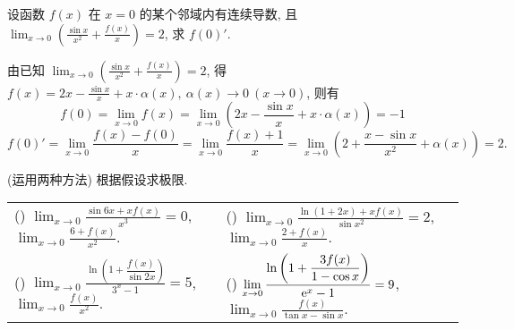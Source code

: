 \begin{example}
    设函数 $f(x)$ 在 $x=0$ 的某个邻域内有连续导数, 且 $\displaystyle\lim_{x\to0}\left(\frac{\sin x}{x^2}+\frac{f(x)}{x}\right)=2$, 求 $f(0)'.$
\end{example}
\begin{solution}
    由已知 $\displaystyle\lim_{x\to0}\left(\frac{\sin x}{x^2}+\frac{f(x)}{x}\right)=2$, 得
    $\displaystyle f(x)=2x-\frac{\sin x}{x}+x\cdot\alpha(x),~\alpha(x)\to0~ (x\to0)$,
    则有 $$f(0)=\lim_{x\to0}f(x)=\lim_{x\to0}\left(2x-\frac{\sin x}{x}+x\cdot \alpha(x)\right)=-1$$
    $$f(0)'=\lim_{x\to0}\frac{f(x)-f(0)}{x}=\lim_{x\to0}\frac{f(x)+1}{x}=\lim_{x\to0}\left(2+\frac{x-\sin x}{x^2}+\alpha(x)\right)=2.$$
\end{solution}
\begin{example}
    (运用两种方法) 根据假设求极限.
    \setcounter{magicrownumbers}{0}
    \begin{table}[H]
        \centering
        \begin{tabular}{l | l}
            (\rownumber{}) $\displaystyle\lim_{x\to0}\frac{\sin 6x+xf(x)}{x^3}=0$, $\displaystyle\lim_{x\to0}\frac{6+f(x)}{x^2}.$                           & (\rownumber{}) $\displaystyle\lim_{x\to0}\frac{\ln(1+2x)+xf(x)}{\sin x^2}=2$, $\displaystyle\lim_{x\to0}\frac{2+f(x)}{x}.$                                    \\
            (\rownumber{}) $\displaystyle\lim_{x\to0}\frac{\ln\left(1+\dfrac{f(x)}{\sin 2x}\right)}{3^x-1}=5$, $\displaystyle\lim_{x\to0}\frac{f(x)}{x^2}.$ & (\rownumber{}) $\displaystyle\lim_{x\to0}\frac{\ln\left(1+\dfrac{3f(x)}{1-\cos x}\right)}{\mathrm{e} ^x-1}=9$, $\displaystyle\lim_{x\to0}\frac{f(x)}{\tan x-\sin x}.$
        \end{tabular}
    \end{table}
\end{example}

